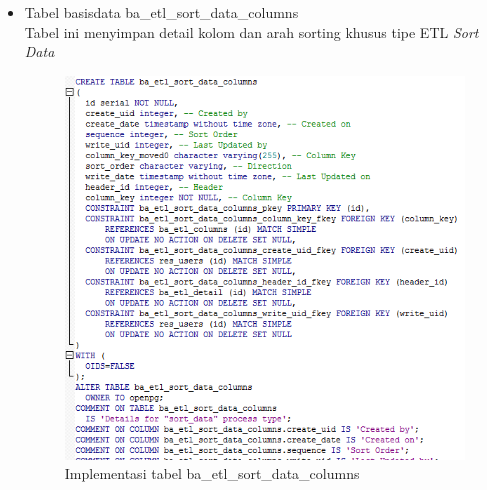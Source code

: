 \begin{itemize}
	\item Tabel basisdata ba\_etl\_sort\_data\_columns\\
	Tabel ini menyimpan detail kolom dan arah sorting khusus tipe ETL \textit{Sort Data}
	\begin{figure}[H]
		\centering
		\includegraphics[scale=0.5]{Gambar/tabel-ba-etl-sort-data-columns}
		\caption{Implementasi tabel ba\_etl\_sort\_data\_columns}
		\end{figure}
		

\end{itemize}
